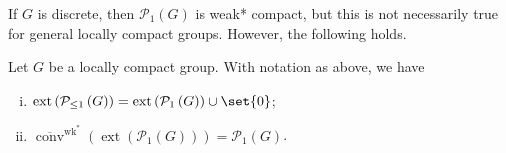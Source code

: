 \documentclass[10pt]{mypackage}
\begin{document}
If $G$ is discrete, then $ \mathcal{P}_1\left( G \right) $ is weak* compact, but this is not necessarily true for general locally compact groups. However, the following holds.
\begin{theorem}
  Let $G$ be a locally compact group. With notation as above, we have
  \begin{enumerate}[(i)]
    \item $\operatorname{ext}\left( \mathcal{P}_{\leq 1}\left( G \right) \right) = \operatorname{ext}\left( \mathcal{P}_{1}\left( G \right) \right) \cup \set{0}$;
    \item $ \overline{\operatorname{conv}}^{\operatorname{wk}^{\ast}}\left( \operatorname{ext}\left( \mathcal{P}_1\left( G \right) \right) \right) = \mathcal{P}_1\left( G \right) $.
  \end{enumerate}
\end{theorem}
\end{document}

